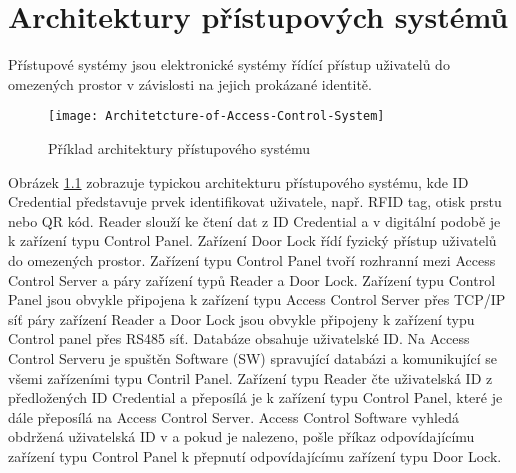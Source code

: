 \chapter{Architektury přístupových systémů}
\DIFaddbegin 

\DIFaddend Přístupové systémy jsou elektronické systémy řídící přístup uživatelů do omezených prostor v závislosti na jejich prokázané identitě.

\begin{figure}[!h]
    \centering
    \DIFdelbeginFL %
\DIFdelendFL \DIFaddbeginFL \texttt{[image: Architetcture-of-Access-Control-System]}
    \DIFaddendFL \caption{Příklad architektury přístupového systému \cite{accessControlSystem_eiprocus}}
    \label{fig:Access control system architecture}
\end{figure}

Obrázek \ref{fig:Access control system architecture} zobrazuje typickou architekturu přístupového systému, kde ID Credential představuje prvek \DIFdelbegin {}\DIFdelend \DIFaddbegin {}\DIFaddend identifikovat uživatele, např. RFID tag, otisk prstu nebo QR kód. 
\DIFaddbegin {}\DIFaddend Reader slouží ke čtení dat z ID Credential a v digitální podobě je \DIFdelbegin {}\DIFdelend \DIFaddbegin {}\DIFaddend k zařízení typu Control Panel.
Zařízení \DIFaddbegin {}\DIFaddend Door Lock řídí fyzický přístup uživatelů do omezených prostor. 
Zařízení typu Control Panel tvoří rozhranní mezi Access Control Server a páry zařízení typů Reader a Door Lock. 
Zařízení typu Control Panel jsou obvykle připojena 
k zařízení typu Access Control Server přes TCP/IP síť \DIFdelbegin {}\DIFdelend \DIFaddbegin {}\DIFaddend páry zařízení \DIFaddbegin {}\DIFaddend Reader a Door Lock jsou obvykle připojeny k zařízení typu Control panel přes RS485 síť\DIFdelbegin {}\DIFdelend . Databáze obsahuje \DIFdelbegin {}\DIFdelend \DIFaddbegin {}\DIFaddend uživatelské ID.
Na Access Control Serveru je spuštěn Software (SW) spravující databázi a komunikující se všemi zařízeními typu Contril Panel.
Zařízení typu Reader čte uživatelská ID z předložených ID Credential \DIFdelbegin {}\DIFdelend a přeposílá je k zařízení typu Control Panel, které je dále přeposílá na Access Control Server. 
Access Control Software vyhledá obdržená uživatelská ID v \DIFdelbegin {}\DIFdelend \DIFaddbegin {}\DIFaddend a pokud je nalezeno, pošle příkaz odpovídajícímu zařízení typu Control Panel k přepnutí odpovídajícímu zařízení typu Door Lock\DIFaddbegin {}\DIFaddend \cite{accessControlSystem_eiprocus}.

